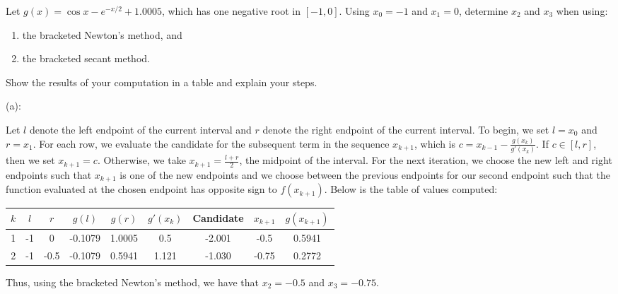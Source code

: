 \documentclass{eh-homework}
\begin{document}
    \begin{question}{4}
    Let \(g(x) = \cos x - e^{-x/2} + 1.0005\), which has one negative root in \([-1, 0]\). Using \(x_0 = -1\) and \(x_1 = 0\), determine \(x_2\) and \(x_3\) when using:
    
    \begin{enumerate}[label=\alph*.]
        \item the bracketed Newton’s method, and
        \item the bracketed secant method.
    \end{enumerate}
    
    Show the results of your computation in a table and explain your steps.

    \medskip

    (a):

    Let \(l\) denote the left endpoint of the current interval and \(r\) denote the right endpoint of the current interval. To begin, we set \(l = x_0\) and \(r = x_1\). For each row, we evaluate the candidate for the subsequent term in the sequence \(x_{k+1}\), which is \(c = x_{k-1} - \frac{g(x_k)}{g'(x_k)}\). If \(c \in [l,r]\), then we set \(x_{k+1} = c\). Otherwise, we take \(x_{k+1} = \frac{l+r}{2}\), the midpoint of the interval. For the next iteration, we choose the new left and right endpoints such that \(x_{k+1}\) is one of the new endpoints and we choose between the previous endpoints for our second endpoint such that the function evaluated at the chosen endpoint has opposite sign to \(f(x_{k+1})\).  Below is the table of values computed:

    \begin{center}
        \begin{tabular}{c|c|c|c|c|c|c|c|c}
            \(k\) & \(l\) & \(r\) & \(g(l)\) & \(g(r)\) & \(g'(x_{k})\) & Candidate & \(x_{k+1}\) & \(g(x_{k+1})\) \\
            \hline
            1 & -1 & 0 & -0.1079 & 1.0005 & 0.5 & -2.001 & -0.5 & 0.5941 \\
            2 & -1 & -0.5 & -0.1079 & 0.5941 & 1.121 & -1.030 & -0.75 & 0.2772
        \end{tabular}
    \end{center}

    \vspace{9pt}

    Thus, using the bracketed Newton's method, we have that \(x_2 = -0.5\) and \(x_3 = -0.75\).

    \medskip


\end{question}
\end{document}
